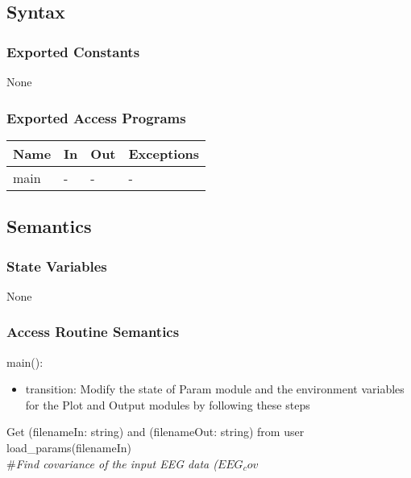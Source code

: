 \documentclass[12pt, titlepage]{article}
\begin{document}
\subsection{Syntax}

\subsubsection{Exported Constants}
None
\subsubsection{Exported Access Programs}

\begin{center}
\begin{tabular}{p{2cm} p{4cm} p{4cm} p{2cm}}
\hline
\textbf{Name} & \textbf{In} & \textbf{Out} & \textbf{Exceptions} \\
\hline
main & - & - & - \\
\hline
\end{tabular}
\end{center}

\subsection{Semantics}

\subsubsection{State Variables}
None

\subsubsection{Access Routine Semantics}

\noindent main():
\begin{itemize}
\item transition: Modify the state of Param module and the environment variables
  for the Plot and Output modules by following these steps\\
\end{itemize}

\noindent Get (filenameIn: string) and (filenameOut: string) from user\\

\noindent load\_params(filenameIn)\\

\noindent \#\textit{Find covariance of the input EEG data ($EEG_cov$} 
\end{document}
